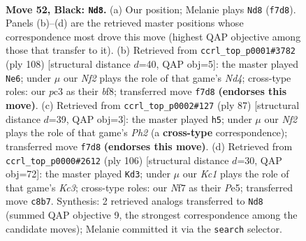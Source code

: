 \documentclass[11pt]{article}
\begin{document}
\clearpage

\begin{figure}[p]\centering
\begin{subfigure}{0.46\textwidth}\centering
\resizebox{\linewidth}{!}{%
\newchessgame
\chessboard[
  setfen={2k1Q3/p1p2np1/1p4p1/2p2q2/8/2P5/1P6/K7 b - - 5 52},
  showmover=false,
  pgfstyle=straightmove, color=movearrow, markmove={f7-d8}
]}
\caption{}
\end{subfigure}\hfill
\begin{subfigure}{0.46\textwidth}\centering
\resizebox{\linewidth}{!}{%
\newchessgame
\chessboard[
  setfen={5b1k/7p/1p3Pp1/6P1/3N3P/2P1Q3/5K2/3q4 w - - 3 55},
  showmover=false,
  pgfstyle=straightmove, color=movearrow, markmove={d4-e6}
]}
\caption{}
\end{subfigure}
\\[4pt]
\begin{subfigure}{0.46\textwidth}\centering
\resizebox{\linewidth}{!}{%
\newchessgame
\chessboard[
  setfen={7k/5Q1p/p2q1p2/Pp2p3/4P3/7P/6P1/7K b - - 0 44},
  showmover=false,
  pgfstyle=straightmove, color=movearrow, markmove={h7-h5}
]}
\caption{}
\end{subfigure}\hfill
\begin{subfigure}{0.46\textwidth}\centering
\resizebox{\linewidth}{!}{%
\newchessgame
\chessboard[
  setfen={6k1/5p2/6p1/2q1P2p/p4P2/2K3P1/1P1Q3P/8 w - - 15 54},
  showmover=false,
  pgfstyle=straightmove, color=movearrow, markmove={c3-d3}
]}
\caption{}
\end{subfigure}
\caption{\textbf{Move 52, Black: \texttt{Nd8}.} (a) Our position; Melanie plays \texttt{Nd8} (\texttt{f7d8}). Panels (b)--(d) are the retrieved master positions whose correspondence most drove this move (highest QAP objective among those that transfer to it). (b) Retrieved from \texttt{ccrl\_top\_p0001\#3782} (ply 108) [structural distance $d$=40, QAP obj=5]: the master played \texttt{Ne6}; under $\mu$ our \emph{Nf2} plays the role of that game's \emph{Nd4}; cross-type roles: our \emph{p}c3 as their \emph{b}f8; transferred move \texttt{f7d8} \textbf{(endorses this move)}. (c) Retrieved from \texttt{ccrl\_top\_p0002\#127} (ply 87) [structural distance $d$=39, QAP obj=3]: the master played \texttt{h5}; under $\mu$ our \emph{Nf2} plays the role of that game's \emph{Ph2} (a \textbf{cross-type} correspondence); transferred move \texttt{f7d8} \textbf{(endorses this move)}. (d) Retrieved from \texttt{ccrl\_top\_p0000\#2612} (ply 106) [structural distance $d$=30, QAP obj=72]: the master played \texttt{Kd3}; under $\mu$ our \emph{Kc1} plays the role of that game's \emph{Kc3}; cross-type roles: our \emph{N}f7 as their \emph{P}e5; transferred move \texttt{c8b7}. Synthesis: 2 retrieved analogs transferred to \texttt{Nd8} (summed QAP objective 9, the strongest correspondence among the candidate moves); Melanie committed it via the \texttt{search} selector.}
\label{fig:thought-m103}
\end{figure}
\end{document}
